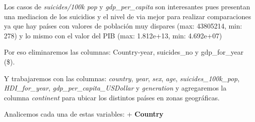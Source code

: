 \documentclass[]{article}
\newenvironment{Shaded}{\begin{snugshade}}{\end{snugshade}}
\newcommand{\CommentTok}[1]{\textcolor[rgb]{0.56,0.35,0.01}{\textit{#1}}}
\newcommand{\KeywordTok}[1]{\textcolor[rgb]{0.13,0.29,0.53}{\textbf{#1}}}
\newcommand{\NormalTok}[1]{#1}
\newcommand{\OperatorTok}[1]{\textcolor[rgb]{0.81,0.36,0.00}{\textbf{#1}}}
\begin{document}
Los casos de \emph{suicides/100k pop} y \emph{gdp\_per\_capita} son
interesantes pues presentan una mediacion de los suicidios y el nivel de
via mejor para realizar comparaciones ya que hay países con valores de
población muy dispares (max: 43805214, min: 278) y lo mismo con el valor
del PIB (max: 1.812e+13, min: 4.692e+07)

Por eso eliminaremos las columnas: Country-year, suicides\_no y
gdp\_for\_year (\$).

Y trabajaremos con las columnas: \emph{country}, \emph{year},
\emph{sex}, \emph{age}, \emph{suicides\_100k\_pop},
\emph{HDI\_for\_year}, \emph{gdp\_per\_capita\_USDollar} y
\emph{generation} y agregaremos la columna \emph{continent} para ubicar
los distintos países en zonas geográficas.

Analicemos cada una de estas variables: + \textbf{Country}

\begin{Shaded}
\end{Shaded}
\end{document}
